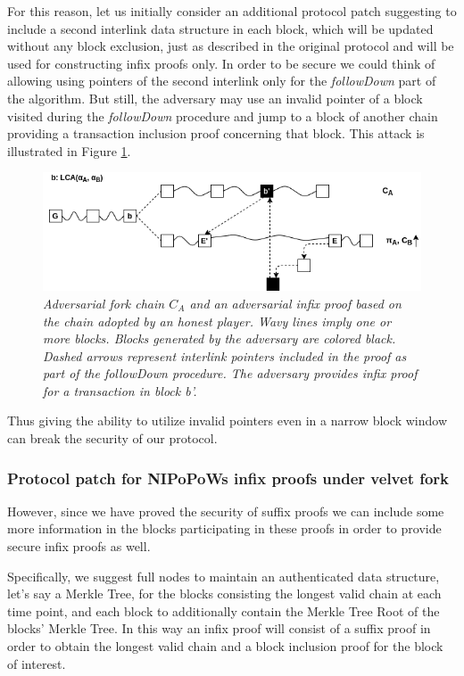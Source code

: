 \documentclass[11pt,a4paper]{article}
\begin{document}
For this reason, let us initially consider an additional protocol patch suggesting to include a second interlink data structure in each block, which will be updated without any block exclusion, just as described in the original protocol and will be used for constructing infix proofs only. In order to be secure we could think of allowing using pointers of the second interlink only for the \textit{followDown} part of the algorithm. But still, the adversary may use an invalid pointer of a block visited during the \textit{followDown} procedure and jump to a block of another chain providing a transaction inclusion proof concerning that block. This attack is illustrated in Figure \ref{fig:infix_attack}.

\begin{figure}[h!]
	\begin{center}
		\includegraphics[scale=0.52]{figures/infix_attack.png}
	\end{center}
	\caption{\textit{Adversarial fork chain $C_A$ and an adversarial infix proof based on the chain adopted by an honest player. Wavy lines imply one or more blocks. Blocks generated by the adversary are colored black. Dashed arrows represent interlink pointers included in the proof as part of the \textit{followDown} procedure. The adversary provides infix proof for a transaction in block b'. }}
	\label{fig:infix_attack}
\end{figure}

Thus giving the ability to utilize invalid pointers even in a narrow block window can break the security of our protocol. 

\subsubsection*{Protocol patch for NIPoPoWs infix proofs under velvet fork}
However, since we have proved the security of suffix proofs we can include some more information in the blocks participating in these proofs in order to provide secure infix proofs as well.
 
Specifically, we suggest full nodes to maintain an authenticated data structure, let's say a Merkle Tree, for the blocks consisting the longest valid chain at each time point, and each block to additionally contain the Merkle Tree Root of  the blocks' Merkle Tree. In this way an infix proof will consist of a suffix proof in order to obtain the longest valid chain and a block inclusion proof for the block of interest. 
\end{document}
